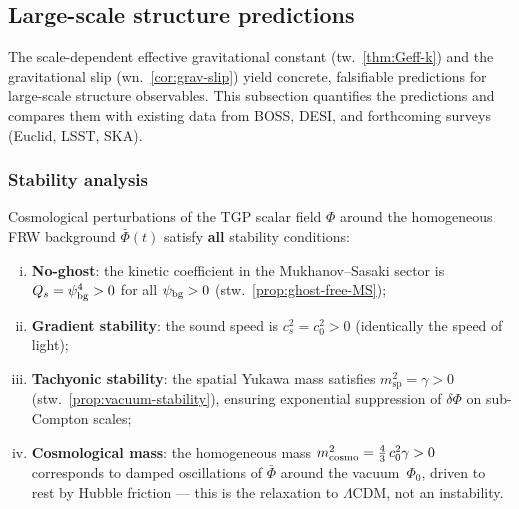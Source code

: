 
\subsection{Large-scale structure predictions}%
\label{ssec:lss-predictions}

The scale-dependent effective gravitational constant
(tw.~\ref{thm:Geff-k}) and the gravitational slip
(wn.~\ref{cor:grav-slip}) yield concrete, falsifiable
predictions for large-scale structure observables.
This subsection quantifies the predictions and compares
them with existing data from BOSS, DESI, and forthcoming
surveys (Euclid, LSST, SKA).

\subsubsection{Stability analysis}%
\label{sssec:lss-stability}

\begin{proposition}%
\label{prop:lss-stability}
Cosmological perturbations of the TGP scalar field $\Phi$
around the homogeneous FRW background $\bar\Phi(t)$
satisfy \textbf{all} stability conditions:
\begin{enumerate}[(i),nosep]
  \item \textbf{No-ghost}: the kinetic coefficient in the
    Mukhanov--Sasaki sector is
    $Q_s = \psi_{\rm bg}^4 > 0$ for all $\psi_{\rm bg} > 0$
    (stw.~\ref{prop:ghost-free-MS});
  \item \textbf{Gradient stability}: the sound speed is
    $c_s^2 = c_0^2 > 0$ (identically the speed of light);
  \item \textbf{Tachyonic stability}: the spatial Yukawa mass satisfies
    $m_{\mathrm{sp}}^2 = \gamma > 0$
    (stw.~\ref{prop:vacuum-stability}), ensuring exponential
    suppression of $\delta\Phi$ on sub-Compton scales;
  \item \textbf{Cosmological mass}: the homogeneous mass
    $m_{\rm cosmo}^2 = \tfrac{4}{3}\,c_0^2\gamma > 0$
    corresponds to damped oscillations of $\bar\Phi$
    around the vacuum~$\Phi_0$, driven to rest by
    Hubble friction --- this is the relaxation to
    $\Lambda$CDM, not an instability.
\end{enumerate}
\end{proposition}

